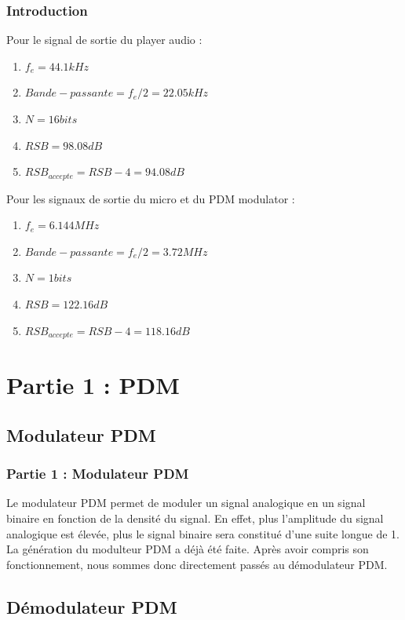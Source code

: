 \documentclass[
10pt,
aspectratio=169,
]{beamer}
\begin{document}
\begin{frame} 
\frametitle{Introduction} 
Pour le signal de sortie du player audio : 
\begin{enumerate} 
\item $f_e = 44.1 kHz$
\item $Bande-passante = f_e/2 = 22.05 kHz$
\item $N = 16 bits$
\item $RSB = 98.08 dB$
\item $RSB_{accepte} = RSB - 4 = 94.08 dB$

\end{enumerate}
\vspace*{0.7cm}
Pour les signaux de sortie du micro et du PDM modulator : 
\begin{enumerate} 
\item $f_e = 6.144 MHz$
\item $Bande-passante = f_e/2 = 3.72 MHz$
\item $N = 1 bits$
\item $RSB = 122.16 dB$
\item $RSB_{accepte} = RSB - 4 = 118.16 dB$

\end{enumerate}
\end{frame}

\section{Partie 1 : PDM}
\subsection{Modulateur PDM}
\begin{frame} 
\frametitle{Partie 1 : Modulateur PDM} 
Le modulateur PDM permet de moduler un signal analogique en un signal binaire en fonction de la densité du signal. En effet, plus l'amplitude du signal analogique est élevée, plus le signal binaire sera constitué d'une suite longue de 1.\\
\vspace*{0.3cm}
La génération du modulteur PDM a déjà été faite. Après avoir compris son fonctionnement, nous sommes donc directement passés au démodulateur PDM.
\end{frame}

\subsection{Démodulateur PDM}
\end{document}
